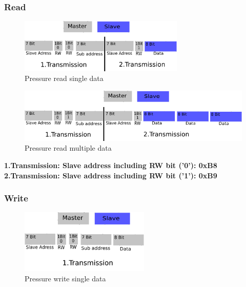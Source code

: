 \subsubsection{Read}
\label{subsubsec:Pressureread}

\begin{figure}[H]
	\centering\includegraphics[width=0.7\textwidth]{fig/ACC_read_single}
	\caption{Pressure read single data}
	\label{fig:Pressure1}
\end{figure}

\begin{figure}[H]
	\centering\includegraphics[width=1\textwidth]{fig/ACC_read_multiple}
	\caption{Pressure read multiple data}
	\label{fig:Pressure2}
\end{figure}

\textbf{1.Transmission: Slave address including RW bit ('0'): 0xB8}\\
\textbf{2.Transmission: Slave address including RW bit ('1'): 0xB9}

\subsubsection{Write}
\label{subsubsec:Pressurewrite}

\begin{figure}[H]
	\centering\includegraphics[width=0.55\textwidth]{fig/ACC_write_single}
	\caption{Pressure write single data}
	\label{fig:Pressure3}
\end{figure}

